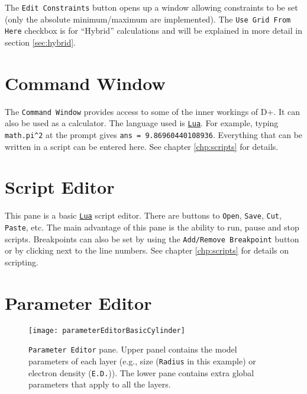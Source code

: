 \documentclass[../D+Manual.tex]{subfiles}
\begin{document}
The \texttt{Edit Constraints} button opens up a window allowing constraints to be set (only the absolute minimum/maximum are implemented). The \texttt{Use Grid From Here} checkbox is for ``Hybrid'' calculations and will be explained in more detail in section \ref{sec:hybrid}.

\section{Command Window} \label{sec:commandWindow}

The \texttt{Command Window} provides access to some of the inner workings of D+. It can also be used as a calculator. The language used is \href{http://www.lua.org/}{\texttt{Lua}}. For example, typing \lstinline[language={[5.0]Lua}]|math.pi^2| at the prompt gives \lstinline[language={[5.0]Lua}]|ans = 9.86960440108936|. Everything that can be written in a script can be entered here. See chapter \ref{chp:scripts} for details.

\section{Script Editor} \label{sec:scriptEditor}

This pane is a basic \href{http://www.lua.org/}{\texttt{Lua}} script editor. There are buttons to \texttt{Open}, \texttt{Save}, \texttt{Cut}, \texttt{Paste}, etc. The main advantage of this pane is the ability to run, pause and stop scripts. Breakpoints can also be set by using the \texttt{Add/Remove Breakpoint} button or by clicking next to the line numbers. See chapter \ref{chp:scripts} for details on scripting.



\section{Parameter Editor} \label{sec:parameterEditor}

\begin{figure}[h!] %
	\centering
    \texttt{[image: parameterEditorBasicCylinder]}
	\caption{\texttt{Parameter Editor} pane. Upper panel contains the model parameters of each layer (e.g., size (\texttt{Radius} in this example) or electron density (\texttt{E.D.})). The lower pane contains extra global parameters that apply to all the layers. }
	\label{fig:ParameterEditor}
\end{figure}
\end{document}
